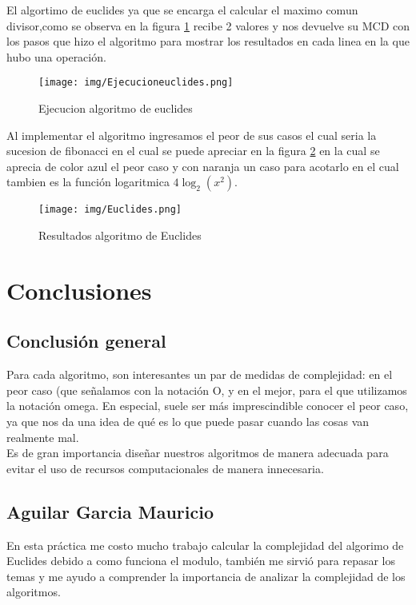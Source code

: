 \documentclass[12pt,twoside]{article}
\begin{document}
El algortimo de euclides ya que se encarga el calcular el maximo comun divisor,como se observa en la figura \ref{ejecucionEuclides} recibe 2 valores y nos devuelve su MCD con los pasos que hizo el algoritmo para mostrar los resultados en cada linea en la que hubo una operación.
\vspace{10 mm}
\begin{figure}[H]
\centering
\texttt{[image: img/Ejecucioneuclides.png]}
\caption{Ejecucion algoritmo de euclides}
\label{ejecucionEuclides}
\end{figure}
\vspace{10 mm}
Al implementar el algoritmo ingresamos el peor de sus casos el cual seria la sucesion de fibonacci en el cual se puede apreciar en la figura \ref{graficaEuclides} en la cual se aprecia de color azul el peor caso y con naranja un caso para acotarlo en el cual tambien es la función logaritmica $4\log_{2} (x^2) $.
\vspace{10 mm}
\begin{figure}[H]
\centering
\texttt{[image: img/Euclides.png]}
\caption{Resultados algoritmo de Euclides}
\label{graficaEuclides}
\end{figure}
\vspace{2000 mm}
\section{Conclusiones}
\vspace{10 mm}
\subsection*{Conclusión general}
Para cada algoritmo, son interesantes un par de medidas de complejidad: en el peor caso (que señalamos con la notación O, y en el mejor, para el que utilizamos la notación omega. En especial, suele ser más imprescindible conocer el peor caso, ya que nos da una idea de qué es lo que puede pasar cuando las cosas van realmente mal.\\

Es de gran importancia diseñar nuestros algoritmos de manera adecuada para evitar el uso de recursos computacionales de manera innecesaria.

\subsection*{Aguilar Garcia Mauricio}
En esta práctica me costo mucho trabajo calcular la complejidad del algorimo de Euclides debido a como funciona el modulo, también me sirvió para repasar los temas y me ayudo a comprender la importancia de analizar la complejidad de los algoritmos.\\
\end{document}
